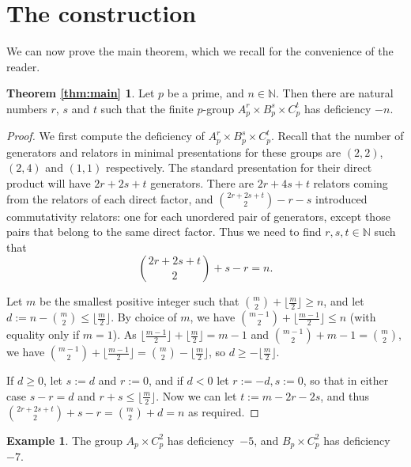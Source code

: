 \documentclass[a4paper,12pt]{amsart}
\theoremstyle{plain}
\theoremstyle{definition}
\newtheorem{eg}[lem]{Example}
\newtheorem*{thmA}{Theorem \ref{thm:main}}
\newcommand{\N}{\mathbb{N}}
\newcommand{\inthalf}[1]{\lfloor \frac{#1}{2} \rfloor}
\begin{document}
\section{The construction}
\label{section:construction}

We can now prove the main theorem, which we recall for the convenience of the reader.

\begin{thmA}
    Let $p$ be a prime, and $n \in \N$.
    Then there are natural numbers $r$, $s$ and $t$ such that the finite $p$-group $A_p^r \times B_p^s \times C_p^t$ has deficiency $-n$.
\end{thmA}

\begin{proof}

    We first compute the deficiency of $A_p^r \times B_p^s \times C_p^t$.
    Recall that the number of generators and relators in minimal presentations for these groups are $(2, 2)$, $(2, 4)$ and $(1, 1)$ respectively.
    The standard presentation for their direct product will have $2r + 2s + t$ generators.
    There are $2r + 4s + t$ relators coming from the relators of each direct factor, and $\binom{2r + 2s + t}{2} - r - s$ introduced commutativity relators: one for each unordered pair of generators, except those pairs that belong to the same direct factor.
    Thus we need to find $r, s, t \in \N$ such that \[
        \binom{2r + 2s + t}{2} + s - r = n.
    \]

    Let $m$ be the smallest positive integer such that $\binom{m}{2} + \inthalf{m} \geq n$, and let $d := n - \binom{m}{2} \leq \inthalf{m}$.
    By choice of $m$, we have $\binom{m-1}{2} + \inthalf{m-1} \leq n$ (with equality only if $m=1$).
    As $\inthalf{m-1} + \inthalf{m} = m-1$ and $\binom{m-1}{2} + m-1 = \binom{m}{2}$, we have $\binom{m-1}{2} + \inthalf{m-1} = \binom{m}{2} - \inthalf{m}$, so $d \geq -\inthalf{m}$.

    If $d \geq 0$, let $s := d$ and $r := 0$, and if $d < 0$ let $r := -d, s := 0$, so that in either case $s-r = d$ and $r+s \leq \inthalf{m}$.
    Now we can let $t := m - 2r - 2s$, and thus $\binom{2r + 2s + t}{2} + s - r = \binom{m}{2} + d = n$ as required.
\end{proof}

\begin{eg}
    The group $A_p \times C_p^2$ has deficiency~$-5$, and $B_p \times C_p^2$ has deficiency~$-7$.
\end{eg}
\end{document}

